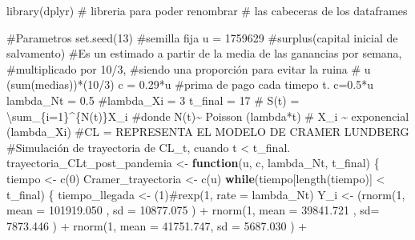 \documentclass[
  us-letterpaper,
]{scrreprt}
\newenvironment{Shaded}{\begin{snugshade}}{\end{snugshade}}
\newcommand{\AttributeTok}[1]{\textcolor[rgb]{0.40,0.45,0.13}{#1}}
\newcommand{\CommentTok}[1]{\textcolor[rgb]{0.37,0.37,0.37}{#1}}
\newcommand{\ControlFlowTok}[1]{\textcolor[rgb]{0.00,0.23,0.31}{\textbf{#1}}}
\newcommand{\DecValTok}[1]{\textcolor[rgb]{0.68,0.00,0.00}{#1}}
\newcommand{\FloatTok}[1]{\textcolor[rgb]{0.68,0.00,0.00}{#1}}
\newcommand{\FunctionTok}[1]{\textcolor[rgb]{0.28,0.35,0.67}{#1}}
\newcommand{\NormalTok}[1]{\textcolor[rgb]{0.00,0.23,0.31}{#1}}
\newcommand{\OtherTok}[1]{\textcolor[rgb]{0.00,0.23,0.31}{#1}}
\newcommand{\SpecialCharTok}[1]{\textcolor[rgb]{0.37,0.37,0.37}{#1}}
\theoremstyle{plain}
\theoremstyle{plain}
\theoremstyle{definition}
\theoremstyle{remark}
\begin{document}
\begin{Shaded}
\begin{Highlighting}[]
\FunctionTok{library}\NormalTok{(dplyr) }\CommentTok{\# libreria para poder renombrar }
\CommentTok{\# las cabeceras de los dataframes}

\CommentTok{\#Parametros}
\FunctionTok{set.seed}\NormalTok{(}\DecValTok{13}\NormalTok{) }\CommentTok{\#semilla fija}
\NormalTok{u }\OtherTok{=} \DecValTok{1759629} \CommentTok{\#surplus(capital inicial de salvamento)}
\CommentTok{\#Es un estimado a partir de la media de las ganancias por semana, }
\CommentTok{\#multiplicado por 10/3, }
\CommentTok{\#siendo una proporción para evitar la ruina}
\CommentTok{\# u (sum(medias))*(10/3)}
\NormalTok{c }\OtherTok{=} \FloatTok{0.29}\SpecialCharTok{*}\NormalTok{u }\CommentTok{\#prima de pago cada timepo t. c=0.5*u}
\NormalTok{lambda\_Nt }\OtherTok{=} \FloatTok{0.5}
\CommentTok{\#lambda\_Xi = 3}
\NormalTok{t\_final }\OtherTok{=} \DecValTok{17}
\CommentTok{\# S(t) = \textbackslash{}sum\_\{i=1\}\^{}\{N(t)\}X\_i}
\CommentTok{\#donde N(t)\textasciitilde{} Poisson (lambda*t)}
\CommentTok{\# X\_i \textasciitilde{} exponencial (lambda\_Xi)}
\CommentTok{\#CL = REPRESENTA EL MODELO DE CRAMER LUNDBERG}
\CommentTok{\#Simulación de trayectoria de CL\_t, cuando t \textless{} t\_final.}
\NormalTok{trayectoria\_CLt\_post\_pandemia }\OtherTok{\textless{}{-}} \ControlFlowTok{function}\NormalTok{(u, c, lambda\_Nt, t\_final)}
\NormalTok{\{}
\NormalTok{  tiempo }\OtherTok{\textless{}{-}} \FunctionTok{c}\NormalTok{(}\DecValTok{0}\NormalTok{)}
\NormalTok{  Cramer\_trayectoria }\OtherTok{\textless{}{-}} \FunctionTok{c}\NormalTok{(u)}
  \ControlFlowTok{while}\NormalTok{(tiempo[}\FunctionTok{length}\NormalTok{(tiempo)] }\SpecialCharTok{\textless{}}\NormalTok{ t\_final)}
\NormalTok{  \{}
\NormalTok{    tiempo\_llegada }\OtherTok{\textless{}{-}}\NormalTok{ (}\DecValTok{1}\NormalTok{)}\CommentTok{\#rexp(1, rate = lambda\_Nt)}
\NormalTok{    Y\_i }\OtherTok{\textless{}{-}}\NormalTok{  (}\FunctionTok{rnorm}\NormalTok{(}\DecValTok{1}\NormalTok{, }\AttributeTok{mean =} \FloatTok{101919.050}\NormalTok{ , }\AttributeTok{sd =} \FloatTok{10877.075}\NormalTok{  ) }
\SpecialCharTok{+} \FunctionTok{rnorm}\NormalTok{(}\DecValTok{1}\NormalTok{, }\AttributeTok{mean =}  \FloatTok{39841.721}\NormalTok{ , }\AttributeTok{sd=} \FloatTok{7873.446} 
\NormalTok{    ) }\SpecialCharTok{+}  
\FunctionTok{rnorm}\NormalTok{(}\DecValTok{1}\NormalTok{, }\AttributeTok{mean =}   \FloatTok{41751.747}\NormalTok{, }\AttributeTok{sd =} \FloatTok{5687.030}\NormalTok{  ) }\SpecialCharTok{+} 

\end{Highlighting}
\end{Shaded}
\end{document}
